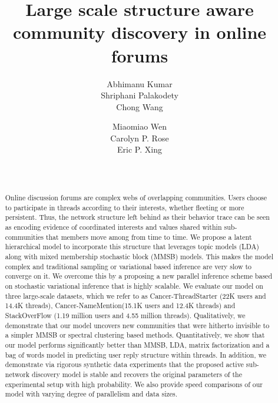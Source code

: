 \documentclass{sig-alternate}
\title{Large scale structure aware community discovery in online forums}
\author{
\alignauthor
Abhimanu Kumar \\
\email{abhimank@cs.cmu.edu}
\alignauthor
Shriphani Palakodety \\
\email{shriphanip@gmail.com}
\alignauthor
Chong Wang \\
\email{chongw@cs.cmu.edu}
\alignauthor
\and
Miaomiao Wen\\
\email{mwen@cs.cmu.edu}
\alignauthor
Carolyn P. Rose\\
\email{cprose@cs.cmu.edu}
\alignauthor
Eric P. Xing\\
\email{epxing@cs.cmu.edu}
\sharedaffiliation
\affaddr{School of Computer Science}  \\
\affaddr{Carnegie Mellon University}  \\
}
\begin{document}
\maketitle
\begin{abstract}
Online discussion forums are complex webs of overlapping communities. 
Users choose to participate in threads according to their interests, 
whether fleeting or more persistent. Thus, the network structure left 
behind as their behavior trace can be seen as encoding evidence of 
coordinated interests and values shared within sub-communities that 
members move among from time to time.  We propose a latent 
hierarchical model to incorporate this structure that leverages topic 
models (LDA) along with mixed membership stochastic block (MMSB) 
models. This makes the model complex and traditional sampling or 
variational based inference are very slow to converge on it. We overcome 
this by a proposing a new parallel inference scheme based on stochastic 
variational inference that is highly scalable. We evaluate our 
model on three large-scale datasets, which we refer to as 
Cancer-ThreadStarter (22K users and 14.4K threads), Cancer-NameMention(15.1K 
users and 12.4K threads) and StackOverFlow (1.19 million users and 
4.55 million threads). Qualitatively, we demonstrate that our 
model uncovers new communities that were hitherto invisible to a 
simpler MMSB or spectral clustering based methods. Quantitatively, we 
show that our model performs significantly better than MMSB, LDA, 
matrix factorization and a bag of words model in predicting 
user reply structure within threads. In addition, we demonstrate 
via rigorous synthetic data experiments that the proposed active sub-network 
discovery model is stable and recovers the original parameters of 
the experimental setup with high probability. We also provide speed 
comparisons of our model with varying degree of parallelism and data sizes.  

\end{abstract}


\end{document}
